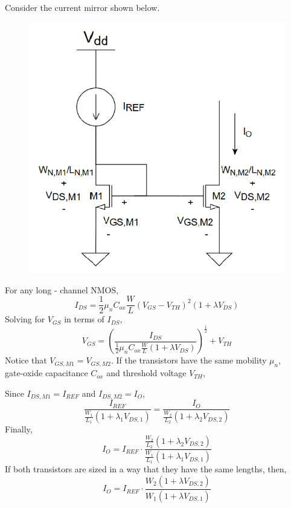 \documentclass{article}
\begin{document}
\noindent Consider the current mirror shown below. 

\begin{figure}[h]
    \includegraphics[scale=0.4]{mir}
\end{figure} 

\noindent For any long - channel NMOS, 
$$I_{DS} = \frac{1}{2} \mu_{n} C_{ox} \frac{W}{L} (V_{GS}-V_{TH})^{2} (1+\lambda V_{DS})$$
Solving for $V_{GS}$ in terms of $I_{DS}$, 
\large
$$V_{GS} = \left( \frac{I_{DS}}{\frac{1}{2} \mu_{n} C_{ox} \frac{W}{L} (1+\lambda V_{DS})} \right)^{\frac{1}{2}} + V_{TH}$$
\normalsize 
Notice that $V_{GS,M1} = V_{GS,M2}$. If the transistors have the same mobility $\mu_{n}$, \\gate-oxide
capacitance $C_{ox}$ and threshold voltage $V_{TH}$,

\vspace{10pt}
\noindent Since $I_{DS,M1} = I_{REF}$ and $I_{DS,M2} = I_{O}$, 
\large 
$$\frac{I_{REF}}{\frac{W_1}{L_1}(1+\lambda_1 V_{DS,1})} = \frac{I_{O}}{\frac{W_2}{L_2}(1+\lambda_2 V_{DS,2})}$$
\normalsize Finally, 
\large
$$I_{O} = I_{REF} \cdot \frac{\frac{W_2}{L_2}(1+\lambda_2 V_{DS,2})}{\frac{W_1}{L_1}(1+\lambda_1 V_{DS,1})}$$
If both transistors are sized in a way that they have the same lengths, then, 
$$I_{O} = I_{REF} \cdot \frac{W_{2}(1+\lambda V_{DS,2})}{W_{1}(1+\lambda V_{DS,1})}$$
\end{document}
